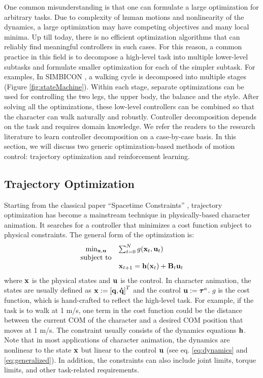 One common misunderstanding is that one can formulate a large optimization for arbitrary tasks. Due to complexity of human motions and nonlinearity of the dynamics, a large optimization may have competing objectives and many local minima. Up till today, there is no efficient optimization algorithms that can reliably find meaningful controllers in such cases. For this reason, a common practice in this field is to decompose a high-level task into multiple lower-level subtasks and formulate smaller optimization for each of the simpler subtask. For examples, In SIMBICON \cite{Yin:2007}, a walking cycle is decomposed into multiple stages (Figure \ref{fig:stateMachine}). Within each stage, separate optimizations can be used for controlling the two legs, the upper body, the balance and the style. After solving all the optimizations, these low-level controllers can be combined so that the character can walk naturally and robustly. Controller decomposition depends on the task and requires domain knowledge. We refer the readers to the research literature to learn controller decomposition on a case-by-case basis. In this section, we will discuss two generic optimization-based methods of motion control: trajectory optimization and reinforcement learning. 



\subsection{Trajectory Optimization}
Starting from the classical paper ``Spacetime Constraints'' \cite{Witkin:1988}, trajectory optimization has become a mainstream technique in physically-based character animation. It searches for a controller that minimizes a cost function subject to physical constraints. The general form of the optimization is:
\begin{equation}
  \begin{array}{cl}
    \min_{\vc{x},\vc{u}}&\sum_{t=0}^{N}g(\vc{x}_t,\vc{u}_t)\\
    \textrm{subject to}&\\
    &\vc{x}_{t+1}=\vc{h}(\vc{x}_t)+\vc{B}_t\vc{u}_t
  \end{array}
  \label{eq:trajectoryOptimization}
\end{equation}
where $\mathbf{x}$ is the physical states and $\mathbf{u}$ is the control. In character animation, the states are usually defined as $\mathbf{x}:=\mathbf{[q, \dot{q}]}^T$ and the control $\mathbf{u}:=\boldsymbol{\tau}^a$. $g$ is the cost function, which is hand-crafted to reflect the high-level task. For example, if the task is to walk at 1 m/s, one term in the cost function could be the distance between the current COM of the character and a desired COM position that moves at 1 m/s. The constraint usually consists of the dynamics equations $\mathbf{h}$. Note that in most applications of character animation, the dynamics are nonlinear to the state $\mathbf{x}$ but linear to the control $\mathbf{u}$ (see eq. \ref{eq:dynamics} and \ref{eq:generalized}). In addition, the constraints can also include joint limits, torque limits, and other task-related requirements.

